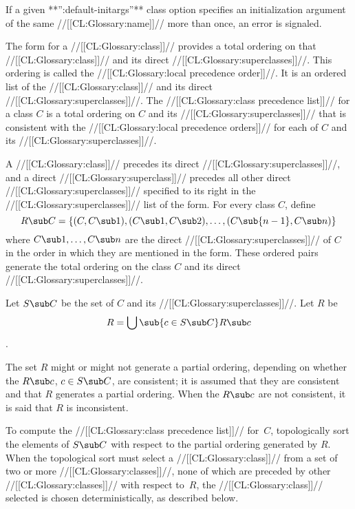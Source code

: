 If a given **'':default-initargs''** class option specifies an initialization argument of the same //[[CL:Glossary:name]]// more than once, an error  is signaled.

\endsubsubsection%

\endsubSection%

 

The  form for a //[[CL:Glossary:class]]// provides a total ordering on that //[[CL:Glossary:class]]// and its direct //[[CL:Glossary:superclasses]]//.  This ordering is called the //[[CL:Glossary:local precedence order]]//.  It is an ordered list of the //[[CL:Glossary:class]]// and its direct //[[CL:Glossary:superclasses]]//. The //[[CL:Glossary:class precedence list]]// for a class $C$ is a total ordering on $C$ and its //[[CL:Glossary:superclasses]]// that is consistent with the //[[CL:Glossary:local precedence orders]]// for each of $C$ and its //[[CL:Glossary:superclasses]]//.

A //[[CL:Glossary:class]]// precedes its direct //[[CL:Glossary:superclasses]]//,  and a direct //[[CL:Glossary:superclass]]// precedes all other  direct //[[CL:Glossary:superclasses]]// specified to its right  in the //[[CL:Glossary:superclasses]]// list of the  form.   For every class $C$, define $$R\sub C=\{(C,C\sub 1),(C\sub 1,C\sub 2),\ldots,(C\sub {n-1},C\sub n)\}$$ where $C\sub 1,\ldots,C\sub n$ are the direct //[[CL:Glossary:superclasses]]// of $C$ in the order in which they are mentioned in the  form. These ordered pairs generate the total ordering on the class $C$ and its direct //[[CL:Glossary:superclasses]]//.

Let $S\sub C$ be the set of $C$ and its //[[CL:Glossary:superclasses]]//. Let $R$ be $$R=\bigcup\sub{c\in {S\sub C}}R\sub c$$.


The set $R$ might or might not generate a partial ordering, depending on whether the $R\sub c$, $c\in S\sub C$, are  consistent; it is assumed that they are consistent and that $R$ generates a partial ordering. When the $R\sub c$ are not consistent, it is said that $R$ is inconsistent.

To compute the //[[CL:Glossary:class precedence list]]// for~$C$\negthinspace, topologically sort the elements of $S\sub C$ with respect to the partial ordering generated by $R$\negthinspace.  When the topological sort must select a //[[CL:Glossary:class]]// from a set of two or more  //[[CL:Glossary:classes]]//, none of which are preceded by other //[[CL:Glossary:classes]]// with respect to~$R$\negthinspace, the //[[CL:Glossary:class]]// selected is chosen deterministically, as described below.

